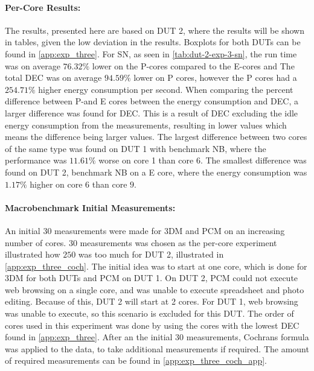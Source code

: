 \paragraph{Per-Core Results:} The results, presented here are based on DUT 2, where the results will be shown in tables, given the low deviation in the results. Boxplots for both DUTs can be found in \cref{app:exp_three}. For SN, as seen in \cref{tab:dut-2-exp-3-sn}, the run time was on average $76.32\%$ lower on the P-cores compared to the E-cores and The total DEC was on average $94.59\%$ lower on P cores, however the P cores had a $254.71\%$ higher energy consumption per second. When comparing the percent difference between P-and E cores between the energy consumption and DEC, a larger difference was found for DEC. This is a result of DEC excluding the idle energy consumption from the measurements, resulting in lower values which means the difference being larger values. %
The largest difference between two cores of the same type was found on DUT 1 with benchmark NB, where the performance was $11.61\%$ worse on core 1 than core 6. The smallest difference was found on DUT 2, benchmark NB on a E core, where the energy consumption was $1.17\%$ higher on core $6$ than core $9$.





\paragraph*{Macrobenchmark Initial Measurements:} An initial $30$ measurements were made for 3DM and PCM on an increasing number of cores. $30$ measurements was chosen as the per-core experiment illustrated how $250$ was too much for DUT 2, illustrated in \cref{app:exp_three_coch}. The initial idea was to start at one core, which is done for 3DM for both DUTs and PCM on DUT 1. On DUT 2, PCM could not execute web browsing on a single core, and was unable to execute spreadsheet and photo editing. Because of this, DUT 2 will start at 2 cores. For DUT 1, web browsing was unable to execute, so this scenario is excluded for this DUT. The order of cores used in this experiment was done by using the cores with the lowest DEC found in \cref{app:exp_three}. After an the initial $30$ measurements, Cochrans formula was applied to the data, to take additional measurements if required. The amount of required measurements can be found in \cref{app:exp_three_coch_app}.

